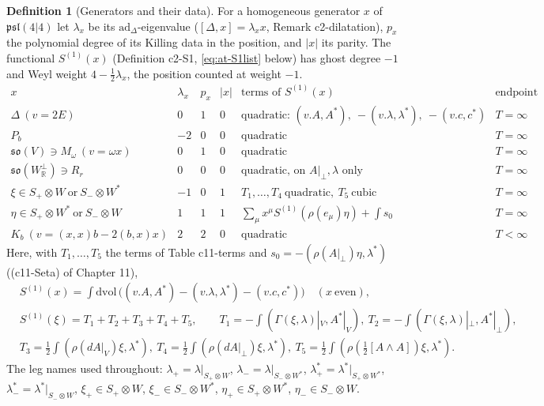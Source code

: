 \documentclass[11pt]{article}
\numberwithin{equation}{section}
\theoremstyle{plain}
\theoremstyle{definition}
\newtheorem{definition}[theorem]{Definition}
\newcommand{\Ap}{A|_{\perp}}
\newcommand{\AV}{A|_V}
\begin{document}
\begin{definition}[Generators and their data]
\label{def:at-gens}
For a homogeneous generator $x$ of $\mathfrak{psl}(4|4)$ let $\lambda_x$ be its $\mathrm{ad}_\Delta$-eigenvalue ($[\Delta,x]=\lambda_xx$, Remark c2-dilatation), $p_x$ the polynomial degree of its Killing data in the position, and $|x|$ its parity. The functional $S^{(1)}(x)$ (Definition c2-S1, \eqref{eq:at-S1list} below) has ghost degree $-1$ and Weyl weight $4-\tfrac12\lambda_x$, the position counted at weight $-1$.
\[
\begin{array}{l|c|c|c|l|l}
x & \lambda_x & p_x & |x| & \text{terms of }S^{(1)}(x) & \text{endpoint}\\
\hline
\Delta\ (v=2E) & 0 & 1 & 0 & \text{quadratic: }(v.A,A^*),\ -(v.\lambda,\lambda^*),\ -(v.c,c^*) & T=\infty\\
P_b & -2 & 0 & 0 & \text{quadratic} & T=\infty\\
\mathfrak{so}(V)\ni M_\omega\ (v=\omega x) & 0 & 1 & 0 & \text{quadratic} & T=\infty\\
\mathfrak{so}(W^\perp_{\mathbb R})\ni R_r & 0 & 0 & 0 & \text{quadratic, on }\Ap,\lambda\text{ only} & T=\infty\\
\xi\in S_+\otimes W\ \text{or}\ S_-\otimes W^* & -1 & 0 & 1 & T_1,\dots,T_4\ \text{quadratic},\ T_5\ \text{cubic} & T=\infty\\
\eta\in S_+\otimes W^*\ \text{or}\ S_-\otimes W & 1 & 1 & 1 & \textstyle\sum_\mu x^\mu S^{(1)}(\rho(e_\mu)\eta)+\int s_0 & T=\infty\\
K_b\ (v=(x,x)b-2(b,x)x) & 2 & 2 & 0 & \text{quadratic} & T<\infty
\end{array}
\]
Here, with $T_1,\dots,T_5$ the terms of Table c11-terms and $s_0=-(\rho(\Ap)\eta,\lambda^*)$ ((c11-Seta) of Chapter 11),
\begin{equation}
\begin{aligned}
&S^{(1)}(x)=\int\mathrm{dvol}\,\big((v.A,A^*)-(v.\lambda,\lambda^*)-(v.c,c^*)\big)\quad(x\ \text{even}),\\
&S^{(1)}(\xi)=T_1+T_2+T_3+T_4+T_5,\qquad T_1=-\int(\Gamma(\xi,\lambda)|_V,A^*|_V),\ T_2=-\int(\Gamma(\xi,\lambda)|_\perp,A^*|_\perp),\\
&T_3=\tfrac12\int(\rho(d\AV)\xi,\lambda^*),\ T_4=\tfrac12\int(\rho(d\Ap)\xi,\lambda^*),\ T_5=\tfrac12\int(\rho(\tfrac12[A\wedge A])\xi,\lambda^*).
\end{aligned}
\label{eq:at-S1list}
\end{equation}
The leg names used throughout: $\lambda_+=\lambda|_{S_+\otimes W}$, $\lambda_-=\lambda|_{S_-\otimes W^*}$, $\lambda^*_+=\lambda^*|_{S_+\otimes W^*}$, $\lambda^*_-=\lambda^*|_{S_-\otimes W}$, $\xi_+\in S_+\otimes W$, $\xi_-\in S_-\otimes W^*$, $\eta_+\in S_+\otimes W^*$, $\eta_-\in S_-\otimes W$.
\end{definition}
\end{document}
